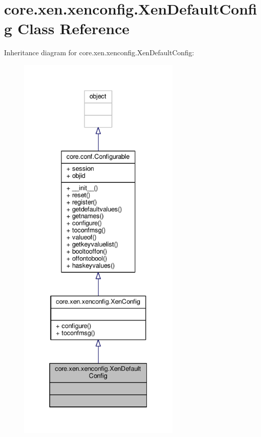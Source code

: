 \hypertarget{classcore_1_1xen_1_1xenconfig_1_1_xen_default_config}{\section{core.\+xen.\+xenconfig.\+Xen\+Default\+Config Class Reference}
\label{classcore_1_1xen_1_1xenconfig_1_1_xen_default_config}
}


Inheritance diagram for core.\+xen.\+xenconfig.\+Xen\+Default\+Config\+:
\nopagebreak
\begin{figure}[H]
\begin{center}
\leavevmode
\includegraphics[height=550pt]{classcore_1_1xen_1_1xenconfig_1_1_xen_default_config__inherit__graph}
\end{center}
\end{figure}


